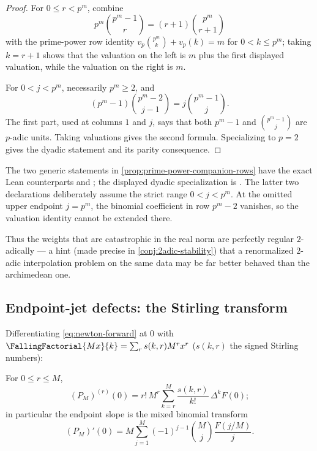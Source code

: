 \begin{proof}
For $0\le r<p^m$, combine
\[
 p^m\binom{p^m-1}{r}=(r+1)\binom{p^m}{r+1}
\]
with the prime-power row identity
$v_p\binom{p^m}{k}+v_p(k)=m$ for $0<k\le p^m$; taking $k=r+1$
shows that the valuation on the left is $m$ plus the first displayed
valuation, while the valuation on the right is $m$.

For $0<j<p^m$, necessarily $p^m\ge2$, and
\[
 (p^m-1)\binom{p^m-2}{j-1}=j\binom{p^m-1}{j}.
\]
The first part, used at columns $1$ and $j$, says that both $p^m-1$ and
$\binom{p^m-1}{j}$ are $p$-adic units.  Taking valuations gives the second
formula.  Specializing to $p=2$ gives the dyadic statement and its parity
consequence.
\end{proof}

The two generic statements in \cref{prop:prime-power-companion-rows} have the
exact Lean counterparts
 and
; the displayed dyadic
specialization is .  The latter two
declarations deliberately assume the strict range $0<j<p^m$.  At the omitted
upper endpoint $j=p^m$, the binomial coefficient in row $p^m-2$ vanishes, so
the valuation identity cannot be extended there.

Thus the weights that are catastrophic in the real norm are perfectly
regular $2$-adically --- a hint (made precise in
\cref{conj:2adic-stability}) that a renormalized $2$-adic
interpolation problem on the same data may be far better behaved than
the archimedean one.

\subsection{Endpoint-jet defects: the Stirling transform}

Differentiating \eqref{eq:newton-forward} at $0$ with
$\FallingFactorial{Mx}{k}=\sum_r s(k,r)M^{r}x^{r}$ ($s(k,r)$ the signed
Stirling numbers):

\begin{proposition}
\label{prop:jet-defect}
For $0\le r\le M$,
\begin{equation}
 (P_M)^{(r)}(0)
 =r!\,M^{r}\sum_{k=r}^{M}\frac{s(k,r)}{k!}\,\Delta^{k}F(0);
 \label{eq:jet-defect}
\end{equation}
in particular the endpoint slope is the mixed binomial transform
\begin{equation}
 (P_M)'(0)
 =M\sum_{j=1}^{M}(-1)^{j-1}\binom Mj\frac{F(j/M)}{j}.
 \label{eq:endpoint-slope}
\end{equation}
\end{proposition}

